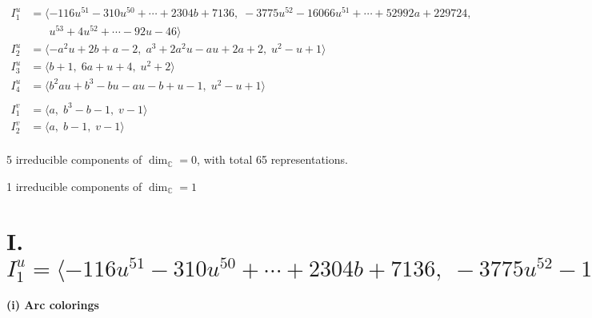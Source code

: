 \documentclass[1p]{elsarticle_modified}
\theoremstyle{definition}
\begin{document}
\begin{align*}
I^u_{1}&=\langle 
-116 u^{51}-310 u^{50}+\cdots+2304 b+7136,\;-3775 u^{52}-16066 u^{51}+\cdots+52992 a+229724,\\
\phantom{I^u_{1}}&\phantom{= \langle  }u^{53}+4 u^{52}+\cdots-92 u-46\rangle \\
I^u_{2}&=\langle 
- a^2 u+2 b+a-2,\;a^3+2 a^2 u- a u+2 a+2,\;u^2- u+1\rangle \\
I^u_{3}&=\langle 
b+1,\;6 a+u+4,\;u^2+2\rangle \\
I^u_{4}&=\langle 
b^2 a u+b^3- b u- a u- b+u-1,\;u^2- u+1\rangle \\
\\
I^v_{1}&=\langle 
a,\;b^3- b-1,\;v-1\rangle \\
I^v_{2}&=\langle 
a,\;b-1,\;v-1\rangle \\
\end{align*}
\raggedright * 5 irreducible components of $\dim_{\mathbb{C}}=0$, with total 65 representations.\\
\raggedright * 1 irreducible components of $\dim_{\mathbb{C}}=1$ \\
\newpage
\renewcommand{\arraystretch}{1}
\centering \section*{I. $I^u_{1}= \langle -116 u^{51}-310 u^{50}+\cdots+2304 b+7136,\;-3775 u^{52}-16066 u^{51}+\cdots+52992 a+229724,\;u^{53}+4 u^{52}+\cdots-92 u-46 \rangle$}
\flushleft \textbf{(i) Arc colorings}\\
\end{document}

